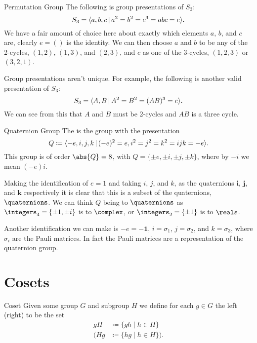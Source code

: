 \documentclass[fleqn]{NotesClass}
\newcommand*{\ident}{\mathbf{1}}
\begin{document}
    \begin{exm}{Permutation Group}{}
        The following is group presentations of \(S_3\):
        \begin{equation}
            S_3 = \presentation{a, b, c}{a^2 = b^2 = c^3 = abc = e}.
        \end{equation}
        We have a fair amount of choice here about exactly which elements \(a\), \(b\), and \(c\) are, clearly \(e = ()\) is the identity.
        We can then choose \(a\) and \(b\) to be any of the 2-cycles, \((1, 2)\), \((1, 3)\), and \((2, 3)\), and \(c\) as one of the 3-cycles, \((1, 2, 3)\) or \((3, 2, 1)\).
        
        Group presentations aren't unique.
        For example, the following is another valid presentation of \(S_3\):
        \begin{equation}
            S_3 = \presentation{A, B}{A^2 = B^2 = (AB)^3 = e}.
        \end{equation}
        We can see from this that \(A\) and \(B\) must be 2-cycles and \(AB\) is a three cycle.
    \end{exm}
    
    \begin{exm}{Quaternion Group}{}
        The  is the group with the presentation
        \begin{equation}
            Q \coloneqq \presentation{-e, i, j, k}{(-e)^2 = e, i^2 = j^2 = k^2 = ijk = -e}.
        \end{equation}
        This group is of order \(\abs{Q} = 8\), with \(Q = \{\pm e, \pm i, \pm j, \pm k\}\), where by \(-i\) we mean \((-e)i\).
        
        Making the identification of \(e = 1\) and taking \(i\), \(j\), and \(k\), as the quaternions \(\mathbf{i}\), \(\mathbf{j}\), and \(\mathbf{k}\) respectively it is clear that this is a subset of the quaternions, \(\quaternions\).
        We can think \(Q\) being to \(\quaternions\) as \(\integers_4 = \{\pm 1, \pm i\}\) is to \(\complex\), or \(\integers_2 = \{\pm 1\}\) is to \(\reals\).
        
        Another identification we can make is \(-e = -\ident\), \(i = \sigma_1\), \(j = \sigma_2\), and \(k = \sigma_3\), where \(\sigma_i\) are the Pauli matrices.
        In fact the Pauli matrices are a representation of the quaternion group.
    \end{exm}
    
    \section{Cosets}
    \begin{dfn}{Coset}{}
        Given some group \(G\) and subgroup \(H\) we define for each \(g \in G\) the left (right)  to be the set
        \begin{align}
            gH &\coloneqq \{gh \mid h \in H\}\\
            (Hg &\coloneqq \{hg \mid h \in H\}).
        \end{align}
    \end{dfn}
    
\end{document}
